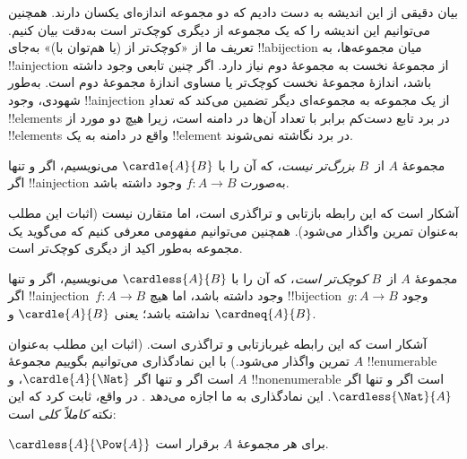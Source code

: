 \documentclass[../../../include/open-logic-section]{subfiles}
\begin{document}


\begin{explain}
بیان دقیقی از این اندیشه به دست دادیم که دو مجموعه اندازه‌ای یکسان
دارند. همچنین می‌توانیم این اندیشه را که یک مجموعه از دیگری کوچک‌تر
است به‌دقت بیان کنیم. تعریف ما از «کوچک‌تر از (یا هم‌توان با)» به‌جای
!!a{bijection} میان مجموعه‌ها، به !!a{injection} از مجموعهٔ نخست به
مجموعهٔ دوم نیاز دارد. اگر چنین تابعی وجود داشته باشد، اندازهٔ مجموعهٔ
نخست کوچک‌تر یا مساوی اندازهٔ مجموعهٔ دوم است. به‌طور شهودی، وجود
!!a{injection} از یک مجموعه به مجموعه‌ای دیگر تضمین می‌کند که تعدادِ
!!{element}s در برد تابع دست‌کم برابر با تعداد آن‌ها در دامنه است، زیرا
هیچ دو مورد از !!{element}s واقع در دامنه به یک !!{element} در برد
نگاشته نمی‌شوند.
\end{explain}

\begin{defn}
مجموعهٔ $A$ از~$B$ \emph{بزرگ‌تر نیست}، که آن را با $\cardle{A}{B}$
می‌نویسیم، اگر و تنها اگر !!a{injection} به‌صورت $f \colon A \to B$
وجود داشته باشد.
\end{defn}

آشکار است که این رابطه بازتابی و تراگذری است، اما متقارن نیست (اثبات
این مطلب به‌عنوان تمرین واگذار می‌شود). همچنین می‌توانیم مفهومی معرفی
کنیم که می‌گوید یک مجموعه به‌طور اکید از دیگری کوچک‌تر است.

\begin{defn}
مجموعهٔ $A$ از~$B$ \emph{کوچک‌تر است}، که آن را با $\cardless{A}{B}$
می‌نویسیم، اگر و تنها اگر !!a{injection}~$f\colon A \to B$ وجود داشته
باشد، اما هیچ !!{bijection}~$g\colon A
\to B$ وجود نداشته باشد؛ یعنی $\cardle{A}{B}$ و $\cardneq{A}{B}$.
\end{defn}

آشکار است که این رابطه غیربازتابی و تراگذری است. (اثبات این مطلب
به‌عنوان تمرین واگذار می‌شود.) با این نمادگذاری می‌توانیم بگوییم
مجموعهٔ $A$ !!{enumerable} است اگر و تنها اگر $\cardle{A}{\Nat}$، و
$A$ !!{nonenumerable} است اگر و تنها اگر $\cardless{\Nat}{A}$. این
نمادگذاری به ما اجازه می‌دهد
. در واقع،
\citet{Cantor1892} ثابت کرد که این نکته \emph{کاملاً کلی} است:

\begin{thm}[کانتور]
$\cardless{A}{\Pow{A}}$ برای هر مجموعهٔ $A$ برقرار است.
\end{thm}
\end{document}
